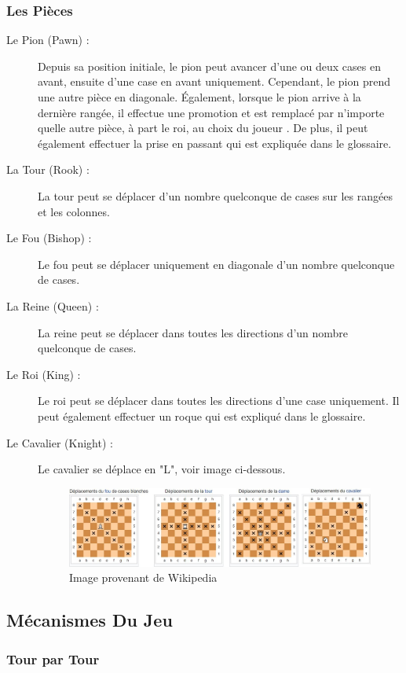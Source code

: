 \documentclass[10pt, a4paper]{article}
\begin{document}
			\subsubsection{Les Pièces}
			\begin{description}
		  \item[Le Pion (Pawn) :] Depuis sa position initiale, le pion peut avancer d'une ou deux cases en avant, ensuite d'une case en avant uniquement. Cependant, le pion prend une autre pièce en diagonale. Également, lorsque le pion arrive à la dernière rangée, il effectue une promotion et est remplacé par n'importe quelle autre pièce, à part le roi, au choix du joueur \label{promote}. De plus, il peut également effectuer la prise en passant qui est expliquée dans le glossaire.
			\item[La Tour (Rook) :] La tour peut se déplacer d'un nombre quelconque de cases sur les rangées et les colonnes.
			\item[Le Fou (Bishop) :] Le fou peut se déplacer uniquement en diagonale d'un nombre quelconque de cases.
			\item[La Reine (Queen) :] La reine peut se déplacer dans toutes les directions d'un nombre quelconque de cases.
			\item[Le Roi (King) :] Le roi peut se déplacer dans toutes les directions d'une case uniquement. Il peut également effectuer un roque qui est expliqué dans le glossaire.
			\item[Le Cavalier (Knight) :] Le cavalier se déplace en "L", voir image ci-dessous.
			\begin{figure}[bh]
			\centering
			\includegraphics[scale=0.50]{pieces_move.png}
			\caption{Image provenant de Wikipedia}
			\end{figure}
			\end{description}
			\clearpage

			\subsection{Mécanismes Du Jeu}
				\subsubsection{Tour par Tour}
\end{document}
